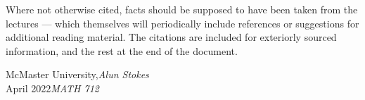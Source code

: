 Where not otherwise cited, facts should be supposed to have been taken from the lectures — which themselves will periodically include references or suggestions for additional reading material. The citations are included for exteriorly sourced information, and the rest at the end of the document.



\vspace{\baselineskip}
\begin{flushright}\noindent
McMaster University,\hfill {\it Alun  Stokes}\\
April 2022\hfill {\it MATH 712}\\
\end{flushright}


